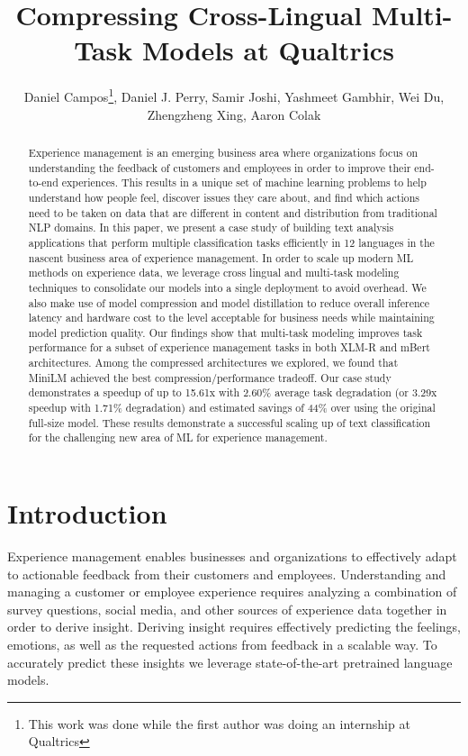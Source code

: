 \documentclass[letterpaper]{article} %
\title{Compressing Cross-Lingual Multi-Task Models at Qualtrics}
\author{
    Daniel Campos\footnote{This work was done while the first author was doing an internship at Qualtrics},
    Daniel J. Perry,
    Samir Joshi,
    Yashmeet Gambhir,
    Wei Du,
    Zhengzheng Xing,
    Aaron Colak
}
\begin{document}
\maketitle

\begin{abstract}
Experience management is an emerging business area where organizations focus on understanding the feedback of customers and employees in order to improve their end-to-end experiences.
This results in a unique set of machine learning problems to help understand how people feel, discover issues they care about, and find which actions need to be taken on data that are different in content and distribution from traditional NLP domains.
In this paper, we present a case study of building text analysis applications that perform multiple classification tasks efficiently in 12 languages in the nascent business area of experience management.
In order to scale up modern ML methods on experience data, we leverage cross lingual and multi-task modeling techniques to consolidate our models into a single deployment to avoid overhead.
We also make use of model compression and model distillation to reduce overall inference latency and hardware cost to the level acceptable for business needs while maintaining model prediction quality.
Our findings show that multi-task modeling improves task performance for a subset of experience management tasks in both XLM-R and mBert architectures.
Among the compressed architectures we explored, we found that MiniLM achieved the best compression/performance tradeoff.
Our case study demonstrates a speedup of up to 15.61x with 2.60\% average task degradation (or 3.29x speedup with 1.71\% degradation) and estimated savings of 44\% over using the original full-size model.
These results demonstrate a successful scaling up of text classification for the challenging new area of ML for experience management.
\end{abstract}

\section*{Introduction}
Experience management enables businesses and organizations to effectively adapt to actionable feedback from their customers and employees.
Understanding and managing a customer or employee experience requires analyzing a combination of survey questions, social media, and other sources of experience data together in order to derive insight.
Deriving insight requires effectively predicting the feelings, emotions, as well as the requested actions from feedback in a scalable way.
To accurately predict these insights we leverage state-of-the-art pretrained language models.
\end{document}
